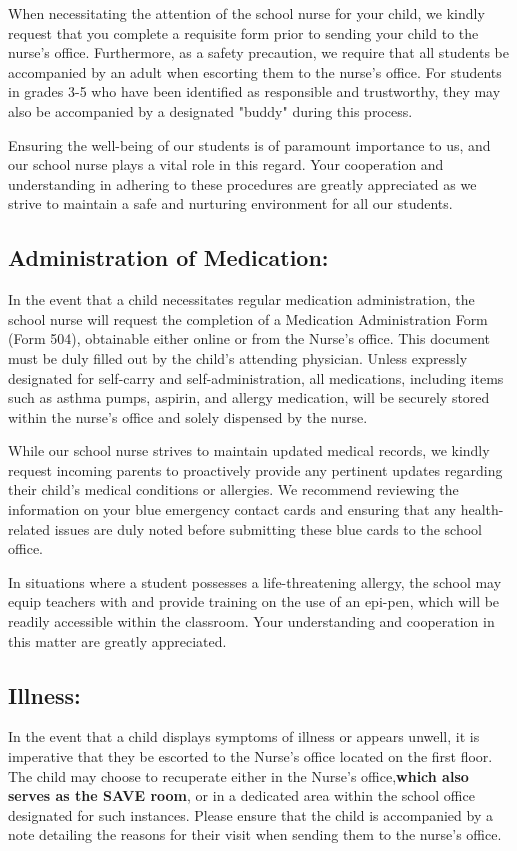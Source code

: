\documentclass[11pt, letterpaper]{article}
\begin{document}
When necessitating the attention of the school nurse for your child, we kindly request that you complete a requisite form prior to sending your child to the nurse's office. Furthermore, as a safety precaution, we require that all students be accompanied by an adult when escorting them to the nurse's office. For students in grades 3-5 who have been identified as responsible and trustworthy, they may also be accompanied by a designated "buddy" during this process.

Ensuring the well-being of our students is of paramount importance to us, and our school nurse plays a vital role in this regard. Your cooperation and understanding in adhering to these procedures are greatly appreciated as we strive to maintain a safe and nurturing environment for all our students.
\subsection{Administration of Medication:}
In the event that a child necessitates regular medication administration, the school nurse will request the completion of a Medication Administration Form (Form 504), obtainable either online or from the Nurse's office. This document must be duly filled out by the child's attending physician. Unless expressly designated for self-carry and self-administration, all medications, including items such as asthma pumps, aspirin, and allergy medication, will be securely stored within the nurse's office and solely dispensed by the nurse.

While our school nurse strives to maintain updated medical records, we kindly request incoming parents to proactively provide any pertinent updates regarding their child's medical conditions or allergies. We recommend reviewing the information on your blue emergency contact cards and ensuring that any health-related issues are duly noted before submitting these blue cards to the school office.

In situations where a student possesses a life-threatening allergy, the school may equip teachers with and provide training on the use of an epi-pen, which will be readily accessible within the classroom. Your understanding and cooperation in this matter are greatly appreciated.
\subsection{Illness:}
In the event that a child displays symptoms of illness or appears unwell, it is imperative that they be escorted to the Nurse's office located on the first floor. The child may choose to recuperate either in the Nurse's office,\textbf{which also serves as the SAVE room}, or in a dedicated area within the school office designated for such instances. Please ensure that the child is accompanied by a note detailing the reasons for their visit when sending them to the nurse's office.
\end{document}
